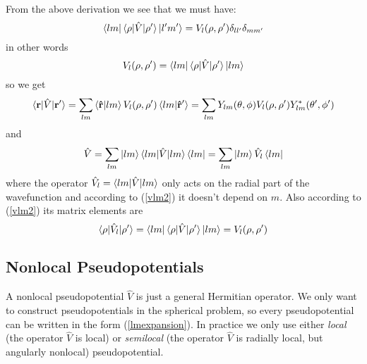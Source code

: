 From the above derivation we see that we must have: 
\begin{equation*}
  \mathinner{\langle{lm}|}\mathinner{\langle{\rho|\hat V|\rho'}\rangle}\mathinner{|{l'm'}\rangle}= V_l(\rho,\rho')\delta_{ll'}\delta_{mm'}
\end{equation*}
in other words 
\begin{equation}
  V_l(\rho,\rho')=\mathinner{\langle{lm}|}\mathinner{\langle{\rho|\hat V|\rho'}\rangle}\mathinner{|{lm}\rangle}  \label{vlm2}
\end{equation}
so we get 
\begin{equation*}
  \mathinner{\langle{{\bf r}|\hat V|{\bf r'}}\rangle} =\sum_{lm}\mathinner{\langle{{\bf\hat r}|lm}\rangle}V_l(\rho,\rho')\mathinner{\langle{lm|\bf\hat r'}\rangle} =\sum_{lm}Y_{lm}(\theta,\phi) V_l(\rho,\rho') Y_{lm}^*(\theta',\phi')
\end{equation*}
and 
\begin{equation*}
  \hat V =\sum_{lm}\mathinner{|{lm}\rangle}\mathinner{\langle{lm|\hat V|lm}\rangle}\mathinner{\langle{lm}|} =\sum_{lm}\mathinner{|{lm}\rangle}\hat V_l\mathinner{\langle{lm}|}
\end{equation*}
where the operator $\hat V_l=\mathinner{\langle{lm|\hat V|lm}\rangle}$ only acts on the radial part of the wavefunction and according to (\ref{vlm2}) it doesn't depend on $m$. Also according to (\ref{vlm2}) its matrix elements are 
\begin{equation*}
  \mathinner{\langle{\rho|\hat V_l|\rho'}\rangle}=\mathinner{\langle{lm}|}\mathinner{\langle{\rho|\hat V|\rho'}\rangle}\mathinner{|{lm}\rangle}= V_l(\rho,\rho')
\end{equation*}

\subsection{Nonlocal Pseudopotentials}

A nonlocal pseudopotential $\hat V$ is just a general Hermitian operator. We
only want to construct pseudopotentials in the spherical problem, so every
pseudopotential can be written in the form (\ref{lmexpansion}). In practice we
only use either {\it local} (the operator $\hat V$ is local) or {\it semilocal}
(the operator $\hat V$ is radially local, but angularly nonlocal) pseudopotential.

